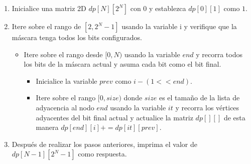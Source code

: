 \begin{enumerate}
	\item Inicialice una matriz 2D $dp[N][2^N]$ con $0$ y establezca $dp[0][1]$ como $1$.
	\item Itere sobre el rango de $[2, 2^N-1]$ usando la variable i y verifique que la máscara tenga todos los bits configurados.
	\begin{itemize}
		\item Itere sobre el rango desde $[0, N)$ usando la variable $end$ y recorra todos los bits de la máscara actual y asuma cada bit como el bit final.
		\begin{itemize}
			\item Inicialice la variable $prev$ como $i-(1 << end)$.
			\item Itere sobre el rango $[0, size)$ donde $size$ es el tamaño de la lista de adyacencia al nodo $end$ usando la variable $it$ y recorra los vértices adyacentes del bit final actual y actualice la matriz $dp[][]$ de esta manera $dp[end][i] += dp[it][prev]$.
		\end{itemize}
	\end{itemize}
	\item Después de realizar los pasos anteriores, imprima el valor de $dp[N-1][2^N-1]$ como respuesta.
\end{enumerate}
